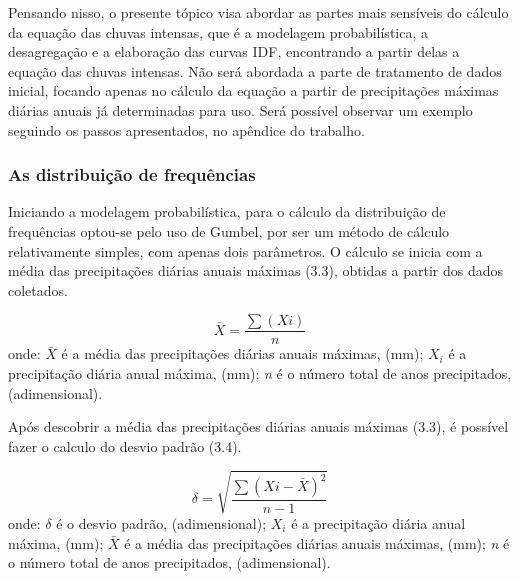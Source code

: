 Pensando nisso, o presente tópico visa abordar as partes mais sensíveis do cálculo da equação das chuvas intensas, que é a modelagem probabilística, a desagregação e a elaboração das curvas IDF, encontrando a partir delas a equação das chuvas intensas. Não será abordada a parte de tratamento de dados inicial, focando apenas no cálculo da equação a partir de precipitações máximas diárias anuais já determinadas para uso. Será possível observar um exemplo seguindo os passos apresentados, no apêndice do trabalho. \bigskip

\subsubsection{As distribuição de frequências}\bigskip

Iniciando a modelagem probabilística, para o cálculo da distribuição de frequências optou-se pelo uso de Gumbel, por ser um método de cálculo relativamente simples, com apenas dois parâmetros. O cálculo se inicia com a média das precipitações diárias anuais máximas (3.3), obtidas a partir dos dados coletados.\bigskip

\newpage

\begin{equation}
\bar{X} = \frac{\sum(Xi)}{n}
\end{equation}
\newline
onde:
\newline
$\bar{X}$ é a média das precipitações diárias anuais máximas, (mm);
\newline
$X_i$ é a precipitação diária anual máxima, (mm);
\newline
\textit{n} é o número total de anos precipitados, (adimensional).\bigskip
 
Após descobrir a média das precipitações diárias anuais máximas (3.3), é possível fazer o calculo do desvio padrão (3.4).\bigskip

\begin{equation}
\delta = \sqrt{\frac{\sum(Xi - \bar{X})^2}{n - 1}}
\end{equation}
\newline
onde:
\newline
$\delta$ é o desvio padrão, (adimensional);
\newline
$X_i$ é a precipitação diária anual máxima, (mm);
\newline
$\bar{X}$ é a média das precipitações diárias anuais máximas, (mm);
\newline
\textit{n} é o número total de anos precipitados, (adimensional).\bigskip

